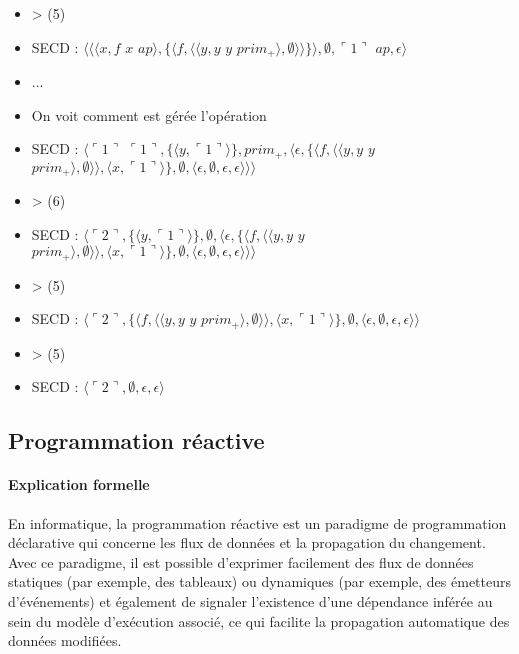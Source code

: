 \documentclass[10pt,a4paper]{article}
\begin{document}
\begin{itemize}
					\item[] > (5)
					\item[] SECD : $\langle\langle\langle x,f$ $x$ $ap\rangle,\{\langle f,\langle\langle y,y$ $y$ $prim_{+}\rangle,\emptyset\rangle\rangle\}\rangle,\emptyset,\ulcorner 1\urcorner$ $ap,\epsilon\rangle$
					\item[] ...
					\item[] On voit comment est gérée l'opération
					\item[] SECD : $\langle\ulcorner 1\urcorner$ $\ulcorner 1\urcorner,\{\langle y,\ulcorner 1\urcorner\rangle\},prim_{+},\langle\epsilon,\{\langle f,\langle\langle y,y$ $y$ $prim_{+}\rangle,\emptyset\rangle\rangle,\langle x,\ulcorner 1\urcorner\rangle\} ,\emptyset,\langle\epsilon,\emptyset,\epsilon,\epsilon\rangle\rangle\rangle$
					\item[] > (6)
					\item[] SECD : $\langle\ulcorner 2\urcorner,\{\langle y,\ulcorner 1\urcorner\rangle\},\emptyset,\langle\epsilon,\{\langle f,\langle\langle y,y$ $y$ $prim_{+}\rangle,\emptyset\rangle\rangle,\langle x,\ulcorner 1\urcorner\rangle\} ,\emptyset,\langle\epsilon,\emptyset,\epsilon,\epsilon\rangle\rangle\rangle$
					\item[] > (5)
					\item[] SECD : $\langle\ulcorner 2\urcorner,\{\langle f,\langle\langle y,y$ $y$ $prim_{+}\rangle,\emptyset\rangle\rangle,\langle x,\ulcorner 1\urcorner\rangle\} ,\emptyset,\langle\epsilon,\emptyset,\epsilon,\epsilon\rangle\rangle$
					\item[] > (5)
					\item[] SECD : $\langle\ulcorner 2\urcorner,\emptyset,\epsilon,\epsilon\rangle$
				\end{itemize}
				\newpage
				


		\subsection{Programmation réactive}
		
			\paragraph{Explication formelle}
			En informatique, la programmation réactive est un paradigme de programmation déclarative qui concerne les flux de données et la propagation du changement. Avec ce paradigme, il est possible d’exprimer facilement des flux de données statiques (par exemple, des tableaux) ou dynamiques (par exemple, des émetteurs d’événements) et également de signaler l’existence d’une dépendance inférée au sein du modèle d’exécution associé, ce qui facilite la propagation automatique des données modifiées.
			\medbreak
			
\end{document}
